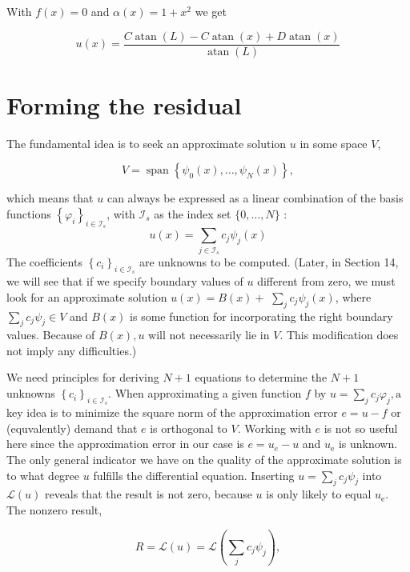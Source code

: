 \documentclass[../main.tex]{subfiles}
\begin{document}
	\noindent With $f(x)=0$ and $\alpha(x)=1+x^{2}$ we get
	
	$$u(x)=\frac{C \operatorname{atan}(L)-C \operatorname{atan}(x)+D \operatorname{atan}(x)}{\operatorname{atan}(L)}$$
	
\section[Forming the residual]{Forming the residual} 
	\label{sec:sec_11_3}
	\noindent The fundamental idea is to seek an approximate solution $u$ in some space $V$,

	$$
	V=\operatorname{span}\left\{\psi_{0}(x), \ldots, \psi_{N}(x)\right\},
	$$
	
	\noindent which means that $u$ can always be expressed as a linear combination of the basis functions $\left\{\varphi_{i}\right\}_{i \in \mathcal{I}_{s}}$, with $\mathcal{I}_{s}$ as the index set $\{0, \ldots, N\}$ :
	$$
	u(x)=\sum_{j \in \mathcal{I}_{s}} c_{j} \psi_{j}(x)
	$$
	The coefficients $\left\{c_{i}\right\}_{i \in \mathcal{I}_{s}}$ are unknowns to be computed.
	(Later, in Section 14, we will see that if we specify boundary values of $u$ different from zero, we must look for an approximate solution $u(x)=B(x)+$ $\sum_{j} c_{j} \psi_{j}(x)$, where $\sum_{j} c_{j} \psi_{j} \in V$ and $B(x)$ is some function for incorporating the right boundary values. Because of $B(x), u$ will not necessarily lie in $V$. This modification does not imply any difficulties.)
	
	We need principles for deriving $N+1$ equations to determine the $N+1$ unknowns $\left\{c_{i}\right\}_{i \in \mathcal{I}_{s}}$. When approximating a given function $f$ by $u=\sum_{j} c_{j} \varphi_{j}, \mathrm{a}$ key idea is to minimize the square norm of the approximation error $e=u-f$ or (equvalently) demand that $e$ is orthogonal to $V$. Working with $e$ is not so useful here since the approximation error in our case is $e=u_{e}-u$ and $u_{\mathrm{e}}$ is unknown. The only general indicator we have on the quality of the approximate solution is to what degree $u$ fulfills the differential equation. Inserting $u=\sum_{j} c_{j} \psi_{j}$ into $\mathcal{L}(u)$ reveals that the result is not zero, because $u$ is only likely to equal $u_{\mathrm{e}}$. The nonzero result,

	\begin{equation}
		\label{eqa132}
		R=\mathcal{L}(u)=\mathcal{L}\left(\sum_{j} c_{j} \psi_{j}\right),
	\end{equation}
\end{document}
